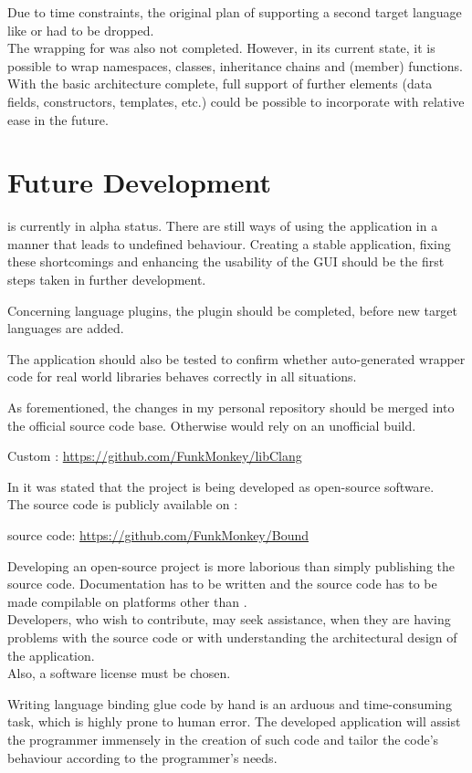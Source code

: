 Due to time constraints, the original plan of supporting a second target language like  or  had to be dropped.\\ The wrapping for  was also not completed. However, in its current state, it is possible to wrap namespaces, classes, inheritance chains and (member) functions.\\
With the basic architecture complete, full support of
further elements (data fields, constructors, templates, etc.) could be possible to incorporate with relative ease in the future.

\chapter{Future Development}
\label{chap:FutureDevelopment}

 is currently in alpha status. There are still ways of using the application in a manner that leads to undefined behaviour. Creating a stable application, fixing these shortcomings and enhancing the usability of the GUI should be the first steps taken in further development.

Concerning language plugins, the  plugin should be completed, before new target languages are added.

The application should also be tested to confirm whether auto-generated wrapper code for real world libraries behaves correctly in all situations.

As forementioned, the changes in my personal  repository should be merged into the official source code base. Otherwise  would rely on an unofficial  build.

\hspace{20pt} Custom : \url{https://github.com/FunkMonkey/libClang}

In  it was stated that the project is being developed as open-source software.\\
The source code is publicly available on :

\hspace{20pt}  source code: \url{https://github.com/FunkMonkey/Bound}

Developing an open-source project is more laborious than simply publishing the source code. Documentation has to be written and the source code has to be made compilable on platforms other than .\\
Developers, who wish to contribute, may seek assistance, when they are having problems with the source code or with understanding the architectural design of the application.\\
Also, a software license must be chosen.

Writing language binding glue code by hand is an arduous and time-consuming task, which is highly prone to human error. The developed application will assist the \linebreak programmer immensely in the creation of such code and tailor the code's behaviour according to the programmer's needs.